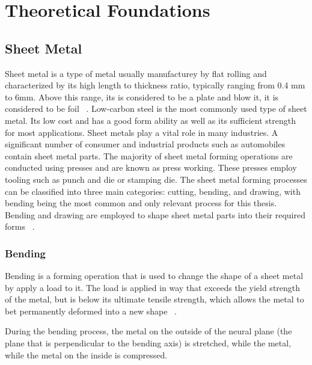 \chapter{Theoretical Foundations}\label{ch:theoretical-foundations}


\section{Sheet Metal}\label{sec:sheet-metal}
Sheet metal is a type of metal usually manufacturey by flat rolling and characterized by
its high
length
to thickness ratio,
typically ranging from 0.4 mm to 6mm.
Above this range, its is considered to be a plate and blow it, it is considered to be
foil~
\cite[p. 405]{groover_fundamentalsmodernmanufacturing_2020}.
Low-carbon steel is the most commonly used type of sheet metal. Its low cost and has a
good form ability as well as its sufficient strength for most applications.
\cite[p. 405]{groover_fundamentalsmodernmanufacturing_2020}
Sheet metals play a vital role in many industries. A significant number of consumer and
industrial products such as automobiles contain sheet metal parts.
The majority of sheet metal forming operations are conducted using presses and are
known as press working.
These presses employ tooling such as punch and die or stamping
die.
The sheet metal forming processes can be classified into three main categories:
cutting, bending, and drawing, with bending being the most common and only relevant
process for this thesis.
Bending and drawing are employed to shape sheet metal parts
into their required forms~
\cite[p. 405]{groover_fundamentalsmodernmanufacturing_2020}.

\subsection{Bending}
Bending is a forming operation that is used to change the shape of a sheet metal by
apply a load to it.
The load is applied in way that exceeds the yield strength of the metal, but is below its
ultimate tensile strength, which allows the metal to bet permanently deformed into a
new shape~
\cite[p. 1]{baig_machinelearningprediction_2021}.

During the bending process, the metal on the outside of the neural plane (the plane
that is perpendicular to the bending axis) is stretched, while the metal, while the
metal on the inside is compressed.

